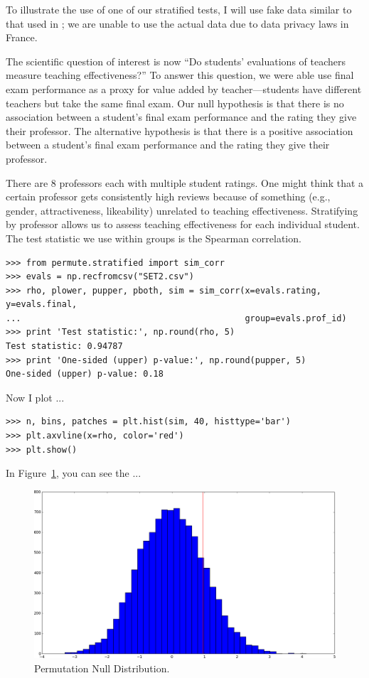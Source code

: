 To illustrate the use of one of our stratified tests, I will use fake
data similar to that used in \cite{boring2015}; we are unable to use
the actual data due to data privacy laws in France.

The scientific question of interest is now ``Do students' evaluations of
teachers measure teaching effectiveness?''  To answer this question, we were
able use final exam performance as a proxy for value added by
teacher---students have different teachers but take the same final exam.
Our null hypothesis is that there is no association between a student's final
exam performance and the rating they give their professor.  The alternative
hypothesis is that there is a positive association between a student's final
exam performance and the rating they give their professor.

There are 8 professors each with multiple student ratings.  One might think
that a certain professor gets consistently high reviews because of something (e.g.,
gender, attractiveness, likeability) unrelated to teaching effectiveness.
Stratifying by professor allows us to assess teaching effectiveness for each
individual student.  The test statistic we use within groups is the Spearman
correlation.

\begin{verbatim}
>>> from permute.stratified import sim_corr
>>> evals = np.recfromcsv("SET2.csv")
>>> rho, plower, pupper, pboth, sim = sim_corr(x=evals.rating, y=evals.final,
...                                            group=evals.prof_id)
>>> print 'Test statistic:', np.round(rho, 5)
Test statistic: 0.94787
>>> print 'One-sided (upper) p-value:', np.round(pupper, 5)
One-sided (upper) p-value: 0.18
\end{verbatim}

Now I plot ...

\begin{verbatim}
>>> n, bins, patches = plt.hist(sim, 40, histtype='bar')
>>> plt.axvline(x=rho, color='red')
>>> plt.show()
\end{verbatim}

In Figure~\ref{fig:figure2}, you can see the ...

\begin{figure}
  \begin{centering}
    \includegraphics[width=.8\textwidth]{fig/figure_2.png}\par
  \end{centering}

  \caption{\label{fig:figure2}Permutation Null Distribution.}

\end{figure}

